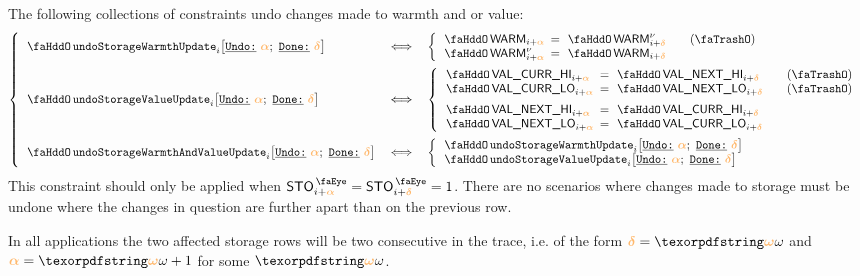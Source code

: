 The following collections of constraints undo changes made to warmth and or value:
\[
	\left\{ \begin{array}{lcl}
		\stoUndoWarmthUpdate {i}{\reluo}{\reldo} & \iff &
		\left\{	\begin{array}{lclr}
			\stoWarmth    _{i + \reluo} & \!\!\! = \!\!\! & \stoWarmth\new_{i + \reldo} & \quad (\trash)             \\
			\stoWarmth\new_{i + \reluo} & \!\!\! = \!\!\! & \stoWarmth    _{i + \reldo}     \\
		\end{array}	\right.	\vspace{2mm}	\\
		\stoUndoValueUpdate {i}{\reluo}{\reldo} & \iff &
		\left\{	\begin{array}{lclr}
			\stoCurrValueHi_{i + \reluo} & \!\!\! = \!\!\! & \stoNextValueHi_{i + \reldo}  & \quad (\trash)             \\
			\stoCurrValueLo_{i + \reluo} & \!\!\! = \!\!\! & \stoNextValueLo_{i + \reldo}  & \quad (\trash)\vspace{2mm} \\
			\stoNextValueHi_{i + \reluo} & \!\!\! = \!\!\! & \stoCurrValueHi_{i + \reldo} \\
			\stoNextValueLo_{i + \reluo} & \!\!\! = \!\!\! & \stoCurrValueLo_{i + \reldo} \\
		\end{array}	\right.	\vspace{2mm}	\\
		\stoUndoWarmthAndValueUpdate {i}{\reluo}{\reldo} & \iff &
		\left\{	\begin{array}{lcl}
			\stoUndoWarmthUpdate {i}{\reluo}{\reldo} \\
			\stoUndoValueUpdate  {i}{\reluo}{\reldo} \\
		\end{array}	\right.	\\
	\end{array} \right.
\]
\saNote{}
This constraint should only be applied when $\peekStorage_{i + \reluo} = \peekStorage_{i + \reldo} = 1$.
There are no scenarios where changes made to storage must be undone where the changes in question are further apart than on the previous row.

\saNote{}
In all applications the two affected storage rows will be two consecutive in the trace, i.e. of the form $\reldo = \relof$ and $\reluo = \relof + 1$ for some $\relof$.

